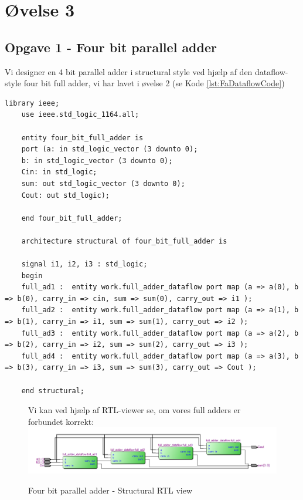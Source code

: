 \section{Øvelse 3}
\subsection{Opgave 1 - Four bit parallel adder}
\begin{enumerate}
	\item[1)]
Vi designer en 4 bit parallel adder i structural style ved hjælp af den dataflow-style four bit full adder, vi har lavet i øvelse 2 (se Kode \ref{lst:FaDataflowCode})


	\medskip
	\begin{lstlisting}[caption={Four bit parallel adder Structural VHDL kode},label={lst:4bitFaStructuralCode}]
	library ieee;
	use ieee.std_logic_1164.all;
	
	entity four_bit_full_adder is
	port (a: in std_logic_vector (3 downto 0);
	b: in std_logic_vector (3 downto 0);
	Cin: in std_logic;
	sum: out std_logic_vector (3 downto 0);
	Cout: out std_logic);
	
	end four_bit_full_adder;
	
	architecture structural of four_bit_full_adder is
	
	signal i1, i2, i3 : std_logic;
	begin
	full_ad1 : 	entity work.full_adder_dataflow port map (a => a(0), b => b(0), carry_in => cin, sum => sum(0), carry_out => i1 );
	full_ad2 : 	entity work.full_adder_dataflow port map (a => a(1), b => b(1), carry_in => i1, sum => sum(1), carry_out => i2 );
	full_ad3 : 	entity work.full_adder_dataflow port map (a => a(2), b => b(2), carry_in => i2, sum => sum(2), carry_out => i3 );
	full_ad4 : 	entity work.full_adder_dataflow port map (a => a(3), b => b(3), carry_in => i3, sum => sum(3), carry_out => Cout );
	
	end structural;
	\end{lstlisting}
	
\begin{figure}[H]
	\item[2)]
	Vi kan ved hjælp af RTL-viewer se, om vores full adders er forbundet korrekt:
	\centering
\includegraphics[scale=0.6]{pictures/Oevelse2/four_bit_full_adder_RTLview.jpeg}
\caption{Four bit parallel adder - Structural RTL view}
\label{fig:4bitFaBehavioralRTL}
\end{figure}


\end{enumerate}
